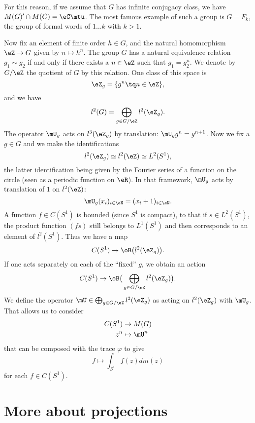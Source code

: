 For this reason, if we assume that $G$ has infinite conjugacy class, we have $M(G)'\cap M(G)=\eC\mtu$. The most famous example of such a group is $G=F_k$, the group of formal words of $1\ldots k$ with $k>1$.

Now fix an element of finite order $h\in G$, and the natural homomorphism $\eZ\to G$ given by $n\mapsto h^n$. The group $G$ has a natural equivalence relation $g_1\sim g_2$ if and only if there exists a $n\in\eZ$ such that $g_1=g_2^n$. We denote by $G/\eZ$ the quotient of $G$ by this relation. One class of this space is
\[
	\eZ_{g}=\{ g^n\tq n\in\eZ \},
\]
and we have
\begin{equation}
	l^2(G)=\bigoplus_{g\in G/\eZ}l^2(\eZ_g).
\end{equation}
The operator $\mU_g$ acts on $l^3(\eZ_g)$ by translation: $\mU_gg^n=g^{n+1}$. Now we fix a $g\in G$ and we make the identifications
\begin{equation}
	l^2(\eZ_g)\simeq l^2(\eZ)\simeq L^2(S^1),
\end{equation}
the latter identification being given by the Fourier series of a function on the circle (seen as a periodic function on $\eR$). In that framework, $\mU_g$ acts by translation of $1$ on $l^2(\eZ)$:
\[
	\mU_g(x_i)_{i\in\eN}=(x_i+1)_{i\in\eN}.
\]
A function $f\in C(S^1)$ is bounded (since $S^1$ is compact), to that if $s\in L^2(S^1)$, the product function $(fs)$ still belongs to $L^1(S^1)$ and then corresponds to an element of $l^2(S^1)$. Thus we have a map
\[
	C(S^1)\to\oB\big( l^2(\eZ_g) \big).
\]
If one acts separately on each of the ``fixed'' $g$, we obtain an action
\[
	C(S^1)\to\oB\big( \bigoplus_{g\in G/\eZ}l^2(\eZ_g) \big).
\]
We define the operator $\mU\in \bigoplus_{g\in G/\eZ}l^2(\eZ_g)  $ as acting on $l^2(\eZ_g)$ with $\mU_g$. That allows us to consider
\begin{equation}
	\begin{aligned}
		C(S^1) & \to M(G)      \\
		z^n    & \mapsto \mU^n
	\end{aligned}
\end{equation}
that can be composed with the trace $\varphi$ to give
\[
	f\mapsto\int_{S^1} f(z)dm(z)
\]
for each $f\in C(S^1)$.


\section{More about projections}

